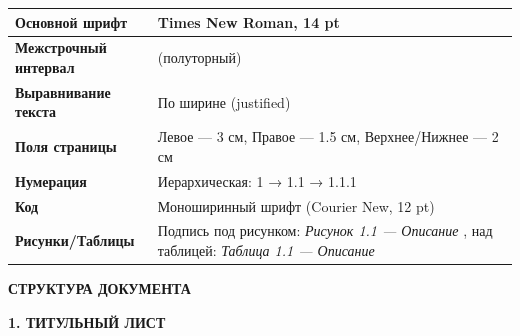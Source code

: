 \documentclass{article}%
\begin{document}
%
\normalsize%
\begin{longtable}{|>{\raggedright\arraybackslash}p{3.0cm}|>{\raggedright\arraybackslash}p{3.0cm}|}%
\hline%
\textbf{Основной шрифт}%
 & Times New Roman, 14 pt%
 \\ \hline \endfirsthead%
\hline%
\textbf{Межстрочный интервал}%
 & 1.5 (полуторный)%
 \\ \hline%
\textbf{Выравнивание текста}%
 & По ширине (justified)%
 \\ \hline%
\textbf{Поля страницы}%
 & Левое — 3 см, Правое — 1.5 см, Верхнее/Нижнее — 2 см%
 \\ \hline%
\textbf{Нумерация}%
 & Иерархическая: 1 → 1.1 → 1.1.1%
 \\ \hline%
\textbf{Код}%
 & Моноширинный шрифт (Courier New, 12 pt)%
 \\ \hline%
\textbf{Рисунки/Таблицы}%
 & Подпись под рисунком: %
\textit{Рисунок 1.1 — Описание}%
, над таблицей: %
\textit{Таблица 1.1 — Описание}%
 \\ \hline%
\end{longtable}%
\begin{flushleft}%
\textbf{СТРУКТУРА ДОКУМЕНТА}%
%
\end{flushleft}%
\begin{flushleft}%
\textbf{1. ТИТУЛЬНЫЙ ЛИСТ}%
%
\end{flushleft}%
\end{document}
